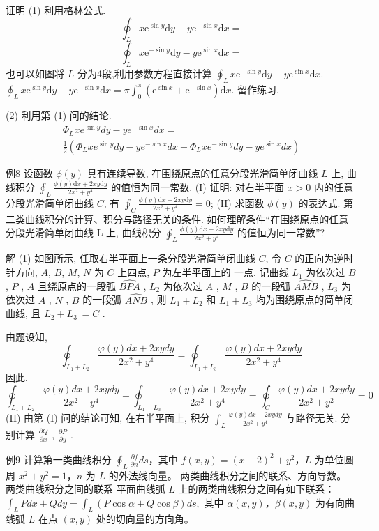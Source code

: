 证明 (1) 利用格林公式.
\[\oint_{L}x\mathrm{e}^{\sin y}\mathrm{d}y - y\mathrm{e}^{-\sin x}\mathrm{d}x =\] \[\oint_{L}x\mathrm{e}^{-\sin y}\mathrm{d}y - y\mathrm{e}^{\sin x}\mathrm{d}x =\]
也可以如图将 \(L\) 分为4段,利用参数方程直接计算 \(\oint_{L}x\mathrm{e}^{-\sin y}\mathrm{d}y - y\mathrm{e}^{\sin x}\mathrm{d}x.\) \(\oint_{L}x\mathrm{e}^{\sin y}\mathrm{d}y - y\mathrm{e}^{-\sin x}\mathrm{d}x = \pi \int_{0}^{\pi}(\mathrm{e}^{\sin x} + \mathrm{e}^{-\sin x})\mathrm{d}x.\) 留作练习.

(2) 利用第 (1) 问的结论.
\begin{align*}
\Phi_L x e^{\sin y} dy - y e^{-\sin x} dx = \\
\frac{1}{2} (\Phi_L x e^{\sin y} dy - y e^{-\sin x} dx + \Phi_L x e^{-\sin y} dy - y e^{\sin x} dx)
\end{align*}

例8 设函数 \(\phi (y)\) 具有连续导数, 在围绕原点的任意分段光滑简单闭曲线 \(L\) 上, 曲线积分 \(\oint_{L} \frac{\phi (y) \mathrm{d}x + 2xy \mathrm{d}y}{2x^{2} + y^{4}}\) 的值恒为同一常数. (I) 证明: 对右半平面 \(x > 0\) 内的任意分段光滑简单闭曲线 \(C\), 有 \(\oint_{C} \frac{\phi (y) \mathrm{d}x + 2xy \mathrm{d}y}{2x^{2} + y^{4}} = 0\); (II) 求函数 \(\phi (y)\) 的表达式.
第二类曲线积分的计算、积分与路径无关的条件.
如何理解条件“在围绕原点的任意分段光滑简单闭曲线 L 上, 曲线积分 \(\oint_{L} \frac{\phi (y) \mathrm{d}x + 2xy \mathrm{d}y}{2x^{2} + y^{4}}\) 的值恒为同一常数”?

解 (1) 如图所示, 任取右半平面上一条分段光滑简单闭曲线 \(C\), 令 \(C\) 的正向为逆时针方向, \(A\), \(B\), \(M\), \(N\) 为 \(C\) 上四点, \(P\) 为左半平面上的 一点.
记曲线 \(L_{1}\) 为依次过 \(B\) , \(P\) , \(A\) 且绕原点的一段弧 \(\widehat{BPA}\) , \(L_{2}\) 为依次过 \(A\) , \(M\) , \(B\) 的一段弧 \(\widehat{AMB}\) , \(L_{3}\) 为依次过 \(A\) , \(N\) , \(B\) 的一段弧 \(\widehat{ANB}\) , 则 \(L_{1} + L_{2}\) 和 \(L_{1} + L_{3}\) 均为围绕原点的简单闭曲线, 且 \(L_{2} + L_{3}^{-} = C\) .

由题设知,
\[ \oint_{L_1+L_2} \frac{\varphi(y)dx + 2xy dy}{2x^2 + y^4} = \oint_{L_1+L_3} \frac{\varphi(y)dx + 2xy dy}{2x^2 + y^4} \]
因此,
\[ \oint_{L_1+L_2} \frac{\varphi(y)dx + 2xy dy}{2x^2 + y^4} - \oint_{L_1+L_3} \frac{\varphi(y)dx + 2xy dy}{2x^2 + y^4} = \oint_C \frac{\varphi(y)dx + 2xy dy}{2x^2 + y^2} = 0 \]
(II) 由第 (I) 问的结论可知, 在右半平面上, 积分 \(\int_L \frac{\varphi(y)dx + 2xy dy}{2x^2 + y^4}\) 与路径无关.
分别计算 \(\frac{\partial Q}{\partial x}\) , \(\frac{\partial P}{\partial y}\) .

例9 计算第一类曲线积分 \(\oint_{L} \frac{\partial f}{\partial n} ds\)，其中 \(f(x, y) = (x - 2)^2 + y^2\)，\(L\) 为单位圆周 \(x^2 + y^2 = 1\)，\(n\) 为 \(L\) 的外法线向量。 两类曲线积分之间的联系、方向导数。 两类曲线积分之间的联系 平面曲线弧 \(L\) 上的两类曲线积分之间有如下联系： \(\int_{L} Pdx + Qdy = \int_{L} (P \cos \alpha + Q \cos \beta) ds,\) 其中 \(\alpha(x, y)\)，\(\beta(x, y)\) 为有向曲线弧 \(L\) 在点 \((x, y)\) 处的切向量的方向角。

